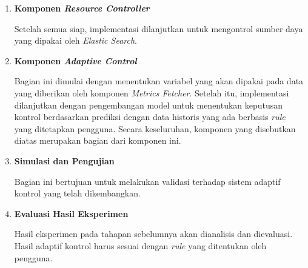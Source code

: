\begin{enumerate}
\begin{enumerate}
        \item \textbf{Komponen \textit{Resource Controller}}
        
        Setelah semua siap, implementasi dilanjutkan untuk mengontrol sumber daya yang dipakai oleh \textit{Elastic Search}.

        \item \textbf{Komponen \textit{Adaptive Control}}
        
        Bagian ini dimulai dengan menentukan variabel yang akan dipakai pada data yang diberikan oleh komponen \textit{Metrics Fetcher}. Setelah itu, implementasi dilanjutkan dengan pengembangan model untuk menentukan keputusan kontrol berdasarkan prediksi dengan data historis yang ada berbasis \textit{rule} yang ditetapkan pengguna. Secara keseluruhan, komponen yang disebutkan diatas merupakan bagian dari komponen ini.

        \item \textbf{Simulasi dan Pengujian}
        
        Bagian ini bertujuan untuk melakukan validasi terhadap sistem adaptif kontrol yang telah dikembangkan.
    
        \item \textbf{Evaluasi Hasil Eksperimen}
        
        Hasil eksperimen pada tahapan sebelumnya akan dianalisis dan dievaluasi. Hasil adaptif kontrol harus sesuai dengan \textit{rule} yang ditentukan oleh pengguna.
    \end{enumerate}
\end{enumerate}
